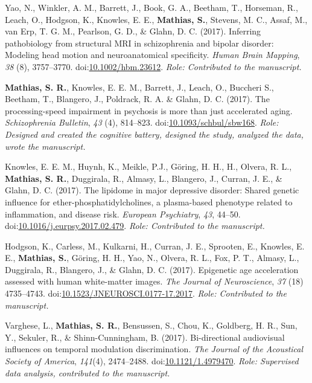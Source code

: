 \documentclass[10pt]{article}
\makeatletter
\newlength{\bibhang}
\newlength{\bibsep}
 {\@listi \global\bibsep\itemsep \global\advance\bibsep by\parsep}
\newenvironment{bibsection}%
        {\vspace{-\baselineskip}\begin{list}{}{%
       \setlength{\leftmargin}{\bibhang}%
       \setlength{\itemindent}{-\leftmargin}%
       \setlength{\itemsep}{\bibsep}%
       \setlength{\parsep}{\z@}%
        \setlength{\partopsep}{0pt}%
        \setlength{\topsep}{0pt}}}
        {\end{list}\vspace{-.6\baselineskip}}
\newcommand\doilink[1]{\href{http://dx.doi.org/#1}{#1}}
\newcommand\doi[1]{doi:\doilink{#1}}
\makeatother
\begin{document}
\begin{bibsection}
\item Yao, N., Winkler, A. M., Barrett, J., Book, G. A., Beetham, T., Horseman, R., Leach, O., Hodgson, K., Knowles, E. E., \textbf{Mathias, S.}, Stevens, M. C., Assaf, M., van Erp, T. G. M., Pearlson, G. D., \& Glahn, D. C. (2017). Inferring pathobiology from structural MRI in schizophrenia and bipolar disorder: Modeling head motion and neuroanatomical specificity. \emph{Human Brain Mapping}, \emph{38} (8), 3757--3770. \doi{10.1002/hbm.23612}. \emph{Role: Contributed to the manuscript.}

\item  \textbf{Mathias, S. R.}, Knowles, E. E. M., Barrett, J., Leach, O., Buccheri S., Beetham, T., Blangero, J., Poldrack, R. A. \& Glahn, D. C. (2017). The processing-speed impairment in psychosis is more than just accelerated aging. \emph{Schizophrenia Bulletin}, \emph{43} (4), 814--823. \doi{10.1093/schbul/sbw168}. \emph{Role: Designed and created the cognitive battery, designed the study, analyzed the data, wrote the manuscript.}

\item Knowles, E. E. M., Huynh, K., Meikle, P.J., G\"oring, H. H., H., Olvera, R. L., \textbf{Mathias, S. R.}, Duggirala, R., Almasy, L., Blangero, J., Curran, J. E., \& Glahn, D. C. (2017). The lipidome in major depressive disorder: Shared genetic influence for ether-phosphatidylcholines, a plasma-based phenotype related to inflammation, and disease risk. \emph{European Psychiatry}, \emph{43}, 44--50. \doi{10.1016/j.eurpsy.2017.02.479}. \emph{Role: Contributed to the manuscript.}

\item Hodgson, K., Carless, M., Kulkarni, H., Curran, J. E., Sprooten, E., Knowles, E. E., \textbf{Mathias,  S.}, G\"oring, H. H., Yao, N., Olvera, R. L., Fox, P. T., Almasy, L., Duggirala, R., Blangero, J., \& Glahn, D. C. (2017). Epigenetic age acceleration assessed with human white-matter images. \emph{The Journal of Neuroscience}, \emph{37} (18) 4735--4743. \doi{10.1523/JNEUROSCI.0177-17.2017}. \emph{Role: Contributed to the manuscript.}

\item Varghese, L., \textbf{Mathias, S. R.}, Bensussen, S., Chou, K., Goldberg, H. R., Sun, Y., Sekuler, R., \& Shinn-Cunningham, B. (2017). Bi-directional audiovisual influences on temporal modulation discrimination. \emph{The Journal of the Acoustical Society of America}, \emph{141}(4), 2474--2488. \doi{10.1121/1.4979470}. \emph{Role: Supervised data analysis, contributed to the manuscript.}


\end{bibsection}
\end{document}
